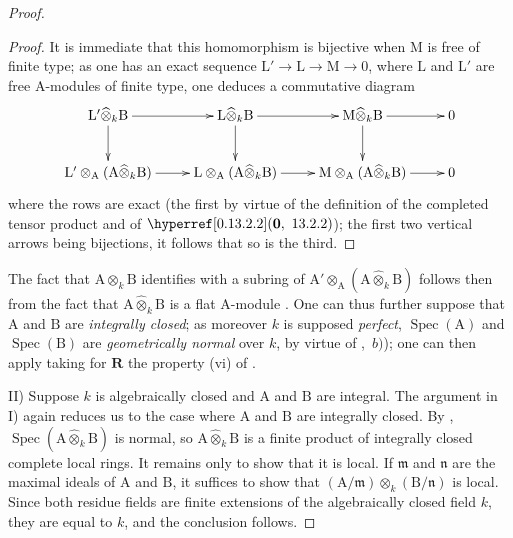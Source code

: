 \begin{proof}
\begin{proof}

It is immediate that this homomorphism is bijective when $\mathrm{M}$ is free of finite type; as one has an exact sequence $\mathrm{L}'\to\mathrm{L}\to\mathrm{M}\to 0$, where $\mathrm{L}$ and $\mathrm{L}'$ are free $\mathrm{A}$-modules of finite type, one deduces a commutative diagram
\[
  \xymatrix{
    \mathrm{L}'\widehat{\otimes}_k\mathrm{B} \ar[r] \ar[d] & \mathrm{L}\widehat{\otimes}_k\mathrm{B} \ar[r] \ar[d] & \mathrm{M}\widehat{\otimes}_k\mathrm{B} \ar[r] \ar[d] & 0 \\
    \mathrm{L}'\otimes_\mathrm{A}(\mathrm{A}\widehat{\otimes}_k\mathrm{B}) \ar[r] & \mathrm{L}\otimes_\mathrm{A}(\mathrm{A}\widehat{\otimes}_k\mathrm{B}) \ar[r] & \mathrm{M}\otimes_\mathrm{A}(\mathrm{A}\widehat{\otimes}_k\mathrm{B}) \ar[r] & 0
  }
\]
where the rows are exact (the first by virtue of the definition of the completed tensor product and of $\sref[0]{0.13.2.2}$); the first two vertical arrows being bijections, it follows that so is the third.
\end{proof}

The fact that $\mathrm{A}\widehat{\otimes}_k\mathrm{B}$ identifies with a subring of $\mathrm{A}'\otimes_\mathrm{A}(\mathrm{A}\widehat{\otimes}_k\mathrm{B})$ follows then from the fact that $\mathrm{A}\widehat{\otimes}_k\mathrm{B}$ is a flat $\mathrm{A}$-module . One can thus further suppose that $\mathrm{A}$ and $\mathrm{B}$ are \emph{integrally closed}; as moreover $k$ is supposed \emph{perfect}, $\operatorname{Spec}(\mathrm{A})$ and $\operatorname{Spec}(\mathrm{B})$ are \emph{geometrically normal} over $k$, by virtue of ,~$b)$); one can then apply  taking for $\boldsymbol{R}$ the property (vi) of .

II) Suppose $k$ is algebraically closed and $\mathrm{A}$ and $\mathrm{B}$ are integral. The argument in I) again reduces us to the case where $\mathrm{A}$ and $\mathrm{B}$ are integrally closed. By , $\operatorname{Spec}(\mathrm{A}\widehat{\otimes}_k\mathrm{B})$ is normal, so $\mathrm{A}\widehat{\otimes}_k\mathrm{B}$ is a finite product of integrally closed complete local rings. It remains only to show that it is local. If $\mathfrak{m}$ and $\mathfrak{n}$ are the maximal ideals of $\mathrm{A}$ and $\mathrm{B}$, it suffices to show that $(\mathrm{A}/\mathfrak{m})\otimes_k(\mathrm{B}/\mathfrak{n})$ is local. Since both residue fields are finite extensions of the algebraically closed field $k$, they are equal to $k$, and the conclusion follows.
\end{proof}

